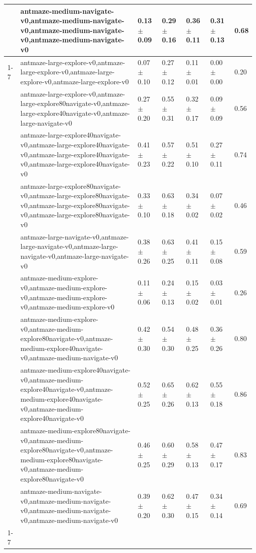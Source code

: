 \begin{tabular}{lllllll}
 & antmaze-medium-navigate-v0,antmaze-medium-navigate-v0,antmaze-medium-navigate-v0,antmaze-medium-navigate-v0 & 0.13 $\pm$ 0.09 & 0.29 $\pm$ 0.16 & 0.36 $\pm$ 0.11 & 0.31 $\pm$ 0.13 & 0.68 \\
\cline{1-7}
\multirow[t]{10}{*}{QRL} & antmaze-large-explore-v0,antmaze-large-explore-v0,antmaze-large-explore-v0,antmaze-large-explore-v0 & 0.07 $\pm$ 0.10 & 0.27 $\pm$ 0.12 & 0.11 $\pm$ 0.01 & 0.00 $\pm$ 0.00 & 0.20 \\
 & antmaze-large-explore-v0,antmaze-large-explore80navigate-v0,antmaze-large-explore40navigate-v0,antmaze-large-navigate-v0 & 0.27 $\pm$ 0.20 & 0.55 $\pm$ 0.31 & 0.32 $\pm$ 0.17 & 0.09 $\pm$ 0.09 & 0.56 \\
 & antmaze-large-explore40navigate-v0,antmaze-large-explore40navigate-v0,antmaze-large-explore40navigate-v0,antmaze-large-explore40navigate-v0 & 0.41 $\pm$ 0.23 & 0.57 $\pm$ 0.22 & 0.51 $\pm$ 0.10 & 0.27 $\pm$ 0.11 & 0.74 \\
 & antmaze-large-explore80navigate-v0,antmaze-large-explore80navigate-v0,antmaze-large-explore80navigate-v0,antmaze-large-explore80navigate-v0 & 0.33 $\pm$ 0.10 & 0.63 $\pm$ 0.18 & 0.34 $\pm$ 0.02 & 0.07 $\pm$ 0.02 & 0.46 \\
 & antmaze-large-navigate-v0,antmaze-large-navigate-v0,antmaze-large-navigate-v0,antmaze-large-navigate-v0 & 0.38 $\pm$ 0.26 & 0.63 $\pm$ 0.25 & 0.41 $\pm$ 0.11 & 0.15 $\pm$ 0.08 & 0.59 \\
 & antmaze-medium-explore-v0,antmaze-medium-explore-v0,antmaze-medium-explore-v0,antmaze-medium-explore-v0 & 0.11 $\pm$ 0.06 & 0.24 $\pm$ 0.13 & 0.15 $\pm$ 0.02 & 0.03 $\pm$ 0.01 & 0.26 \\
 & antmaze-medium-explore-v0,antmaze-medium-explore80navigate-v0,antmaze-medium-explore40navigate-v0,antmaze-medium-navigate-v0 & 0.42 $\pm$ 0.30 & 0.54 $\pm$ 0.30 & 0.48 $\pm$ 0.25 & 0.36 $\pm$ 0.26 & 0.80 \\
 & antmaze-medium-explore40navigate-v0,antmaze-medium-explore40navigate-v0,antmaze-medium-explore40navigate-v0,antmaze-medium-explore40navigate-v0 & 0.52 $\pm$ 0.25 & 0.65 $\pm$ 0.26 & 0.62 $\pm$ 0.13 & 0.55 $\pm$ 0.18 & 0.86 \\
 & antmaze-medium-explore80navigate-v0,antmaze-medium-explore80navigate-v0,antmaze-medium-explore80navigate-v0,antmaze-medium-explore80navigate-v0 & 0.46 $\pm$ 0.25 & 0.60 $\pm$ 0.29 & 0.58 $\pm$ 0.13 & 0.47 $\pm$ 0.17 & 0.83 \\
 & antmaze-medium-navigate-v0,antmaze-medium-navigate-v0,antmaze-medium-navigate-v0,antmaze-medium-navigate-v0 & 0.39 $\pm$ 0.20 & 0.62 $\pm$ 0.30 & 0.47 $\pm$ 0.15 & 0.34 $\pm$ 0.14 & 0.69 \\
\cline{1-7}
\bottomrule
\end{tabular}
